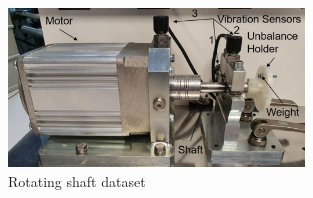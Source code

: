 


\begin{figure}[h]
\centering
\includegraphics[width=0.7\textwidth]{assets/rotating-shaft.jpg}
\caption{Rotating shaft dataset \cite{mey_machine_2020}}
\label{fig:rotating-shaft}
\end{figure}

\cite{mey_machine_2020}

